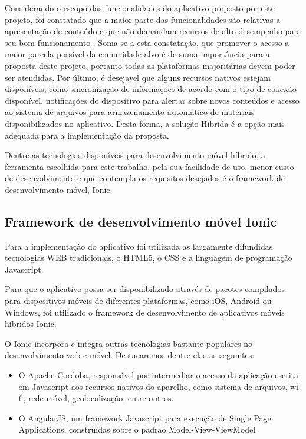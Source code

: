 Considerando o escopo das funcionalidades do aplicativo proposto por este projeto, foi constatado que a maior parte das funcionalidades são relativas a apresentação de conteúdo e que não demandam recursos de alto desempenho para seu bom funcionamento \cite{article:malovolta2}. Soma-se a esta constatação, que promover o acesso a maior parcela possível da comunidade alvo é de suma importância para a proposta deste projeto, portanto todas as plataformas majoritárias devem poder ser atendidas. Por último, é desejavel que alguns recursos nativos estejam disponíveis, como sincronização de informações de acordo com o tipo de conexão disponível, notificações do dispositivo para alertar sobre novos conteúdos e acesso ao sistema de arquivos para armazenamento automático de materiais disponibilizados no aplicativo. Desta forma, a solução Híbrida é a opção mais adequada para a implementação da proposta.

Dentre as tecnologias disponíveis para desenvolvimento móvel híbrido, a ferramenta escolhida para este trabalho, pela sua facilidade de uso, menor custo de desenvolvimento \cite{article:ibm} e que contempla os requisitos desejados é o framework de desenvolvimento móvel, Ionic.


\subsection{Framework de desenvolvimento móvel Ionic}

Para a implementação do aplicativo foi utilizada as largamente difundidas tecnologias WEB tradicionais, o HTML5, o CSS e a linguagem de programação Javascript.

Para que o aplicativo possa ser disponibilizado através de pacotes compilados para dispositivos móveis de diferentes plataformas, como iOS, Android ou Windows, foi utilizado o framework de desenvolvimento de aplicativos móveis híbridos Ionic.

O Ionic incorpora e integra outras tecnologias bastante populares no desenvolvimento web e móvel. Destacaremos dentre elas as seguintes:

\begin{itemize}
    \item O Apache Cordoba, responsável por intermediar o acesso da aplicação escrita em Javascript aos recursos nativos do aparelho, como sistema de arquivos, wi-fi, rede móvel, geolocalização, entre outros.
    \item O AngularJS, um framework Javascript para execução de Single Page Applications, construídas sobre o padrao Model-View-ViewModel
\end{itemize}


